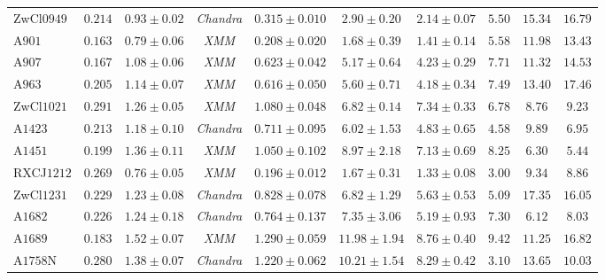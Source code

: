 \documentclass[iop, apj]{emulateapj}
\newcommand{\?}{\stackrel{?}{=}}
\begin{document}
\begin{table*}[H]
\begin{center}
\begin{tabular}{lccccccccc}
 ZwCl$0949$ &$0.214$ &$0.93\pm0.02$ &{\it Chandra} &$0.315\pm0.010$  &$2.90\pm0.20$ &$2.14\pm0.07$     & $5.50$ & $15.34$ & $16.79$ \\%
 A$901$ &$0.163$ &$0.79\pm0.06$ &{\it XMM} &$0.208\pm0.020$ &$1.68\pm0.39$ &$1.41\pm0.14$    & $5.58$ & $11.98$ & $13.43$ \\%
 A$907$ &$0.167$ &$1.08\pm0.06$ &{\it XMM} &$0.623\pm0.042$ &$5.17\pm0.64$ &$4.23\pm0.29$    & $7.71$ & $11.32$ & $14.53$ \\%
 A$963$ &$0.205$ &$1.14\pm0.07$ &{\it XMM} &$0.616\pm0.050$  &$5.60\pm0.71$ &$4.18\pm0.34$   & $7.49$ & $13.40$ & $17.46$ \\%
 ZwCl$1021$ &$0.291$ &$1.26\pm0.05$ &{\it XMM} &$1.080\pm0.048$ &$6.82\pm0.14$ &$7.34\pm0.33$ & $6.78$ & $8.76$  & $9.23$ \\ %
 A$1423$ &$0.213$ &$1.18\pm0.10$ &{\it Chandra}	  &$0.711\pm0.095$ &$6.02\pm1.53$ &$4.83\pm0.65$      & $4.58$ & $9.89$  & $6.95$  \\%
 A$1451$ &$0.199$ &$1.36\pm0.11$ &{\it XMM} &$1.050\pm0.102$  &$8.97\pm2.18$ &$7.13\pm0.69$   & $8.25$ & $6.30$  & $5.44$  \\%
 RXCJ$1212$ &$0.269$ &$0.76\pm0.05$ &{\it XMM} &$0.196\pm0.012$ &$1.67\pm0.31$ &$1.33\pm0.08$ & $3.00$ & $9.34$  & $8.86$  \\%
 ZwCl$1231$ &$0.229$ &$1.23\pm0.08$ &{\it Chandra} &$0.828\pm0.078$  &$6.82\pm1.29$ &$5.63\pm0.53$     & $5.09$ & $17.35$ & $16.05$ \\%
 A$1682$ &$0.226$ &$1.24\pm0.18$ &{\it Chandra}	  &$0.764\pm0.137$  &$7.35\pm3.06$ &$5.19\pm0.93$     & $7.30$ & $6.12$  & $8.03$  \\%
 A$1689$ &$0.183$ &$1.52\pm0.07$ &{\it XMM} &$1.290\pm0.059$  &$11.98\pm1.94$&$8.76\pm0.40$   & $9.42$ & $11.25$ & $16.82$ \\%
 A$1758$N &$0.280$ &$1.38\pm0.07$&{\it Chandra}	  &$1.220\pm0.062$ &$10.21\pm1.54$&$8.29\pm0.42$      & $3.10$ & $13.65$ & $10.03$ \\%

\end{tabular}
\end{center}
\end{table*}
\end{document}
